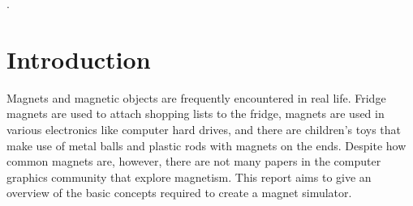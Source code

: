 \documentclass[tog]{acmsiggraph}
\begin{document}

\begin{CRcatlist}
  .
\end{CRcatlist}


\keywordlist




\copyrightspace


\section{Introduction}

Magnets and magnetic objects are frequently encountered in real life. Fridge magnets are used to attach shopping lists to the fridge, magnets are used in various electronics like computer hard drives, and there are children's toys that make use of metal balls and plastic rods with magnets on the ends. Despite how common magnets are, however, there are not many papers in the computer graphics community that explore magnetism. This report aims to give an overview of the basic concepts required to create a magnet simulator.
\end{document}
